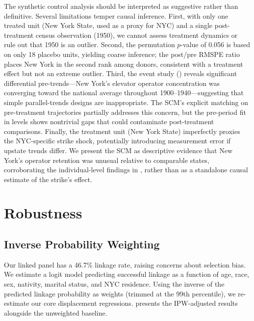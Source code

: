 \documentclass[12pt]{article}
\begin{document}
The synthetic control analysis should be interpreted as suggestive rather than definitive. Several limitations temper causal inference. First, with only one treated unit (New York State, used as a proxy for NYC) and a single post-treatment census observation (1950), we cannot assess treatment dynamics or rule out that 1950 is an outlier. Second, the permutation $p$-value of 0.056 is based on only 18 placebo units, yielding coarse inference; the post/pre RMSPE ratio places New York in the second rank among donors, consistent with a treatment effect but not an extreme outlier. Third, the event study () reveals significant differential pre-trends---New York's elevator operator concentration was converging toward the national average throughout 1900--1940---suggesting that simple parallel-trends designs are inappropriate. The SCM's explicit matching on pre-treatment trajectories partially addresses this concern, but the pre-period fit in levels shows nontrivial gaps that could contaminate post-treatment comparisons. Finally, the treatment unit (New York State) imperfectly proxies the NYC-specific strike shock, potentially introducing measurement error if upstate trends differ. We present the SCM as descriptive evidence that New York's operator retention was unusual relative to comparable states, corroborating the individual-level findings in , rather than as a standalone causal estimate of the strike's effect.



\section{Robustness} \label{sec:robustness}

\subsection{Inverse Probability Weighting}

Our linked panel has a 46.7\% linkage rate, raising concerns about selection bias. We estimate a logit model predicting successful linkage as a function of age, race, sex, nativity, marital status, and NYC residence. Using the inverse of the predicted linkage probability as weights (trimmed at the 99th percentile), we re-estimate our core displacement regressions.  presents the IPW-adjusted results alongside the unweighted baseline.
\end{document}
